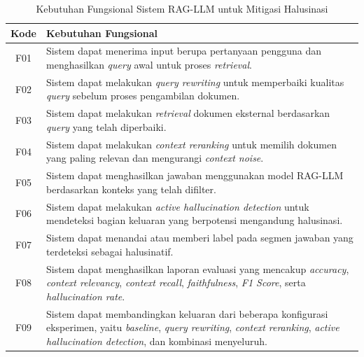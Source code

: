 \begin{table}[H]
\centering
\caption{Kebutuhan Fungsional Sistem RAG-LLM untuk Mitigasi Halusinasi}
\label{tbl:kebutuhan-fungsional}
\begin{tabular}{|c|p{11cm}|}
\hline
\textbf{Kode} & \textbf{Kebutuhan Fungsional} \\ \hline

F01 & Sistem dapat menerima input berupa pertanyaan pengguna dan menghasilkan \textit{query} awal untuk proses \textit{retrieval}. \\ \hline

F02 & Sistem dapat melakukan \textit{query rewriting} untuk memperbaiki kualitas \textit{query} sebelum proses pengambilan dokumen. \\ \hline

F03 & Sistem dapat melakukan \textit{retrieval} dokumen eksternal berdasarkan \textit{query} yang telah diperbaiki. \\ \hline

F04 & Sistem dapat melakukan \textit{context reranking} untuk memilih dokumen yang paling relevan dan mengurangi \textit{context noise}. \\ \hline

F05 & Sistem dapat menghasilkan jawaban menggunakan model RAG-LLM berdasarkan konteks yang telah difilter. \\ \hline

F06 & Sistem dapat melakukan \textit{active hallucination detection} untuk mendeteksi bagian keluaran yang berpotensi mengandung halusinasi. \\ \hline

F07 & Sistem dapat menandai atau memberi label pada segmen jawaban yang terdeteksi sebagai halusinatif. \\ \hline

F08 & Sistem dapat menghasilkan laporan evaluasi yang mencakup \textit{accuracy}, \textit{context relevancy}, \textit{context recall}, \textit{faithfulness}, \textit{F1 Score}, serta \textit{hallucination rate}. \\ \hline

F09 & Sistem dapat membandingkan keluaran dari beberapa konfigurasi eksperimen, yaitu \textit{baseline}, \textit{query rewriting}, \textit{context reranking}, \textit{active hallucination detection}, dan kombinasi menyeluruh. \\ \hline

\end{tabular}
\end{table}

